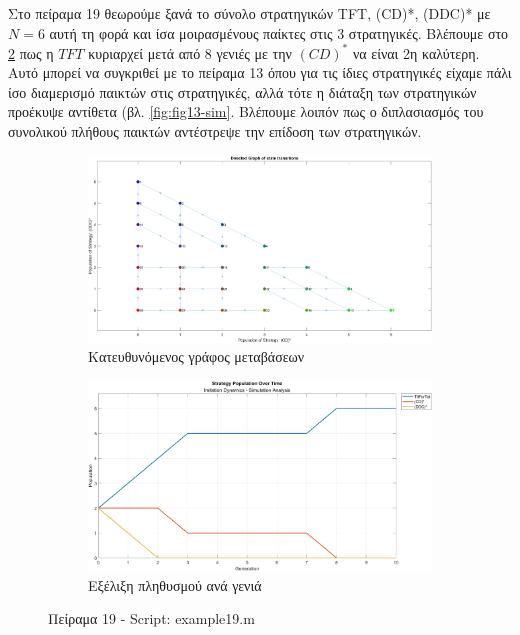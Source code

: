 \documentclass[12pt]{report}
\begin{document}
Στο πείραμα 19 θεωρούμε ξανά το σύνολο στρατηγικών \foreignlanguage{english}{TFT, (CD)*, (DDC)*} με $N=6$ αυτή τη φορά και ίσα μοιρασμένους παίκτες στις 3 στρατηγικές. Βλέπουμε στο \ref{fig:fig19-sim} πως η $TFT$ κυριαρχεί μετά από 8 γενιές με την $(CD)^*$ να είναι 2η καλύτερη. Αυτό μπορεί να συγκριθεί με το πείραμα 13 όπου για τις ίδιες στρατηγικές είχαμε πάλι ίσο διαμερισμό παικτών στις στρατηγικές, αλλά τότε η διάταξη των στρατηγικών προέκυψε αντίθετα (βλ. \ref{fig:fig13-sim}. Βλέπουμε λοιπόν πως ο διπλασιασμός του συνολικού πλήθους παικτών αντέστρεψε την επίδοση των στρατηγικών.
\begin{figure}[H]
    \centering

    \begin{subfigure}[b]{0.45\textwidth}
        \includegraphics[width=\linewidth]{Figures Imitation Dynamics/example19.png}
        \caption{Κατευθυνόμενος γράφος μεταβάσεων}
        \label{fig:fig19}
    \end{subfigure}
    \hfill
    \begin{subfigure}[b]{0.45\textwidth}
        \includegraphics[width=\linewidth]{Figures Imitation Dynamics/example19-sim.png}
        \caption{Εξέλιξη πληθυσμού ανά γενιά}
        \label{fig:fig19-sim}
    \end{subfigure}

    \caption{Πείραμα 19 - \foreignlanguage{english}{Script: example19.m}}
    \label{fig:example19}
\end{figure}
\end{document}
